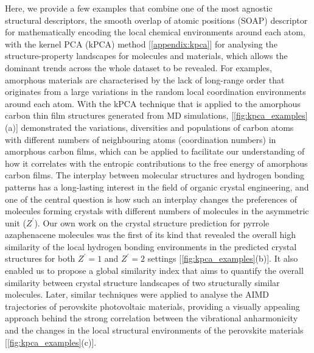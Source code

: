 Here, we provide a few examples that combine one of the most agnostic structural descriptors, the smooth overlap of atomic positions (SOAP) descriptor\cite{bartok2013representing,de2016comparing} for  mathematically encoding the local chemical environments around each atom,  with the kernel PCA (kPCA) method [\cref{appendix:kpca}] for analysing the structure-property landscapes for molecules and materials, which allows the dominant trends across the whole dataset to be revealed. For examples, amorphous materials are characterised by the lack of long-range order that originates from a large variations in the random local coordination environments around each atom. With the kPCA technique that is applied to the amorphous carbon thin film structures generated from MD simulations,\cite{deringer2018computational} \citet{cheng2020mapping} [\cref{fig:kpca_examples}(a)] demonstrated the variations, diversities and populations of carbon atoms with different numbers of neighbouring atoms (coordination numbers) in amorphous carbon films, which can be applied to facilitate our understanding of how it correlates with the entropic contributions to the free energy of amorphous carbon films. The interplay between molecular structures and hydrogen bonding patterns has a long-lasting interest in the field of organic crystal engineering, and one of the central question is how such an interplay changes the preferences of molecules forming crystals with different numbers of molecules in the asymmetric unit ($Z^\prime$). Our own work on the crystal structure prediction for pyrrole azaphenacene molecules\cite{yang2019interplay} was the first of its kind that revealed the overall high similarity of the local hydrogen bonding environments in the predicted crystal structures for both $Z^\prime=1$ and $Z^\prime=2$ settings [\cref{fig:kpca_examples}(b)]. It also enabled us to propose a global similarity index that aims to quantify the overall similarity between  crystal structure landscapes of two structurally similar molecules. Later, similar techniques were applied to analyse the AIMD trajectories of perovskite photovoltaic materials,\cite{yang2020mapping} providing a visually appealing approach behind the strong correlation between the vibrational anharmonicity  and the changes in the local structural environments of the perovskite materials [\cref{fig:kpca_examples}(c)].

